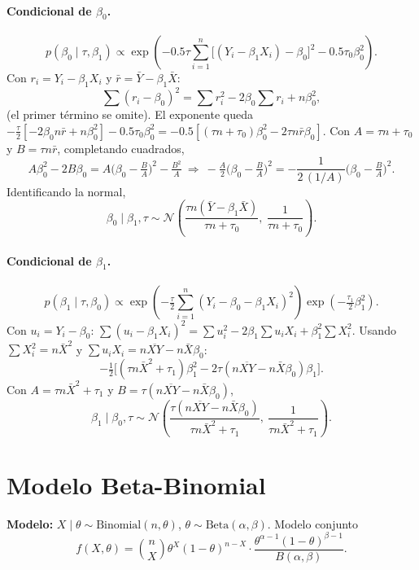 \documentclass[11pt]{article}
\newcommand{\N}{\mathcal{N}}
\theoremstyle{definition}
\begin{document}
\paragraph{Condicional de $\beta_0$.}
\[
p(\beta_0\mid\tau,\beta_1)\propto\exp\!\left(-0.5\tau\sum_{i=1}^n\big[(Y_i-\beta_1 X_i)-\beta_0\big]^2-0.5\tau_0\beta_0^2\right).
\]
Con $r_i=Y_i-\beta_1 X_i$ y $\bar r=\bar Y-\beta_1\bar X$:
\[
\sum(r_i-\beta_0)^2=\sum r_i^2-2\beta_0\sum r_i+n\beta_0^2,
\]
(el primer término se omite). El exponente queda $-\tfrac{\tau}{2}[-2\beta_0 n\bar r+n\beta_0^2]-0.5\tau_0\beta_0^2=-0.5[(\tau n+\tau_0)\beta_0^2-2\tau n\bar r\beta_0]$. Con $A=\tau n+\tau_0$ y $B=\tau n\bar r$, completando cuadrados,
\[
A\beta_0^2-2B\beta_0=A\Big(\beta_0-\tfrac{B}{A}\Big)^2-\tfrac{B^2}{A}\ \Rightarrow\ -\tfrac{A}{2}\Big(\beta_0-\tfrac{B}{A}\Big)^2=-\frac{1}{2\,(1/A)}\Big(\beta_0-\tfrac{B}{A}\Big)^2.
\]
Identificando la normal,
\[
\beta_0\mid\beta_1,\tau\sim\N\!\left(\frac{\tau n(\bar Y-\beta_1\bar X)}{\tau n+\tau_0},\ \frac{1}{\tau n+\tau_0}\right).
\]

\paragraph{Condicional de $\beta_1$.}
\[
p(\beta_1\mid\tau,\beta_0)\propto\exp\!\left(-\tfrac{\tau}{2}\sum_{i=1}^n(Y_i-\beta_0-\beta_1 X_i)^2\right)\exp\!\left(-\tfrac{\tau_1}{2}\beta_1^2\right).
\]
Con $u_i=Y_i-\beta_0$: $\sum(u_i-\beta_1 X_i)^2=\sum u_i^2-2\beta_1\sum u_i X_i+\beta_1^2\sum X_i^2$. Usando $\sum X_i^2=n\bar X^2$ y $\sum u_i X_i=n\overline{XY}-n\bar X\beta_0$:
\[
-\tfrac12\big[(\tau n\bar X^2+\tau_1)\beta_1^2-2\tau(n\overline{XY}-n\bar X\beta_0)\beta_1\big].
\]
Con $A=\tau n\bar X^2+\tau_1$ y $B=\tau(n\overline{XY}-n\bar X\beta_0)$,
\[
\beta_1\mid\beta_0,\tau\sim\N\!\left(\frac{\tau(n\overline{XY}-n\bar X\beta_0)}{\tau n\bar X^2+\tau_1},\ \frac{1}{\tau n\bar X^2+\tau_1}\right).
\]

\section{Modelo Beta-Binomial}
\textbf{Modelo:} $X\mid\theta\sim\text{Binomial}(n,\theta)$, $\theta\sim\text{Beta}(\alpha,\beta)$. Modelo conjunto
\[
f(X,\theta)=\binom{n}{X}\theta^{X}(1-\theta)^{n-X}\cdot\frac{\theta^{\alpha-1}(1-\theta)^{\beta-1}}{B(\alpha,\beta)}.
\]

\end{document}
